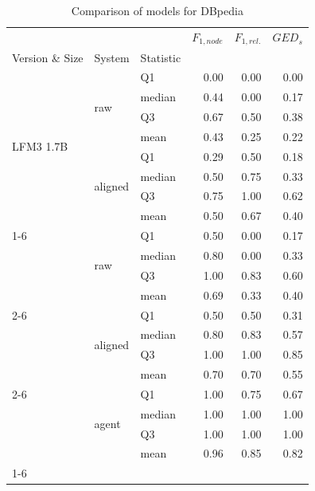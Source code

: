 \begin{table}
\caption{Comparison of models for DBpedia}
\label{tab:compare_model_DBpedia}
\begin{tabular}{lllrrr}
\toprule
 &  &  & $F_{1,node}$ & $F_{1,rel.}$ & $GED_{s}$ \\
Version \& Size & System & Statistic &  &  &  \\
\midrule
\multirow[t]{8}{*}{LFM3 1.7B} & \multirow[t]{4}{*}{raw} & Q1 & 0.00 & 0.00 & 0.00 \\
 &  & median & 0.44 & 0.00 & 0.17 \\
 &  & Q3 & 0.67 & 0.50 & 0.38 \\
 &  & mean & 0.43 & 0.25 & 0.22 \\
\cline{2-6}
 & \multirow[t]{4}{*}{aligned} & Q1 & 0.29 & 0.50 & 0.18 \\
 &  & median & 0.50 & 0.75 & 0.33 \\
 &  & Q3 & 0.75 & 1.00 & 0.62 \\
 &  & mean & 0.50 & 0.67 & 0.40 \\
\cline{1-6} \cline{2-6}
\multirow[t]{12}{*}{Qwen3.8 27B} & \multirow[t]{4}{*}{raw} & Q1 & 0.50 & 0.00 & 0.17 \\
 &  & median & 0.80 & 0.00 & 0.33 \\
 &  & Q3 & 1.00 & 0.83 & 0.60 \\
 &  & mean & 0.69 & 0.33 & 0.40 \\
\cline{2-6}
 & \multirow[t]{4}{*}{aligned} & Q1 & 0.50 & 0.50 & 0.31 \\
 &  & median & 0.80 & 0.83 & 0.57 \\
 &  & Q3 & 1.00 & 1.00 & 0.85 \\
 &  & mean & 0.70 & 0.70 & 0.55 \\
\cline{2-6}
 & \multirow[t]{4}{*}{agent} & Q1 & 1.00 & 0.75 & 0.67 \\
 &  & median & 1.00 & 1.00 & 1.00 \\
 &  & Q3 & 1.00 & 1.00 & 1.00 \\
 &  & mean & 0.96 & 0.85 & 0.82 \\
\cline{1-6} \cline{2-6}
\bottomrule
\end{tabular}
\end{table}
